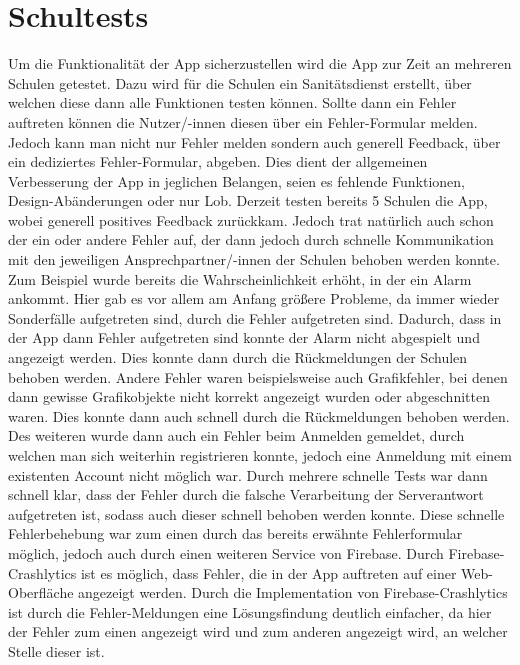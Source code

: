 \section{Schultests}
Um die Funktionalität der App sicherzustellen wird die App zur Zeit an 
mehreren Schulen getestet. Dazu wird für die Schulen ein Sanitätsdienst erstellt,
über welchen diese dann alle Funktionen testen können. Sollte dann ein Fehler
auftreten können die Nutzer/-innen diesen über ein Fehler-Formular melden. 
Jedoch kann man nicht nur Fehler melden sondern auch generell Feedback, über ein
dediziertes Fehler-Formular, abgeben. Dies dient der allgemeinen Verbesserung
der App in jeglichen Belangen, seien es fehlende Funktionen, Design-Abänderungen
oder nur Lob. Derzeit testen bereits 5 Schulen die App, wobei generell positives
Feedback zurückkam. Jedoch trat natürlich auch schon der ein oder andere Fehler 
auf, der dann jedoch durch schnelle Kommunikation mit den jeweiligen 
Ansprechpartner/-innen der Schulen behoben werden konnte.
Zum Beispiel wurde bereits die Wahrscheinlichkeit erhöht, in der ein Alarm 
ankommt. Hier gab es vor allem am Anfang größere Probleme, da immer wieder 
Sonderfälle aufgetreten sind, durch die Fehler aufgetreten sind. Dadurch, dass
in der App dann Fehler aufgetreten sind konnte der Alarm nicht abgespielt und 
angezeigt werden. Dies konnte dann durch die Rückmeldungen der Schulen behoben
werden. Andere Fehler waren beispielsweise auch Grafikfehler, bei denen dann
gewisse Grafikobjekte nicht korrekt angezeigt wurden oder abgeschnitten waren.
Dies konnte dann auch schnell durch die Rückmeldungen behoben werden.
Des weiteren wurde dann auch ein Fehler beim Anmelden gemeldet, durch welchen
man sich weiterhin registrieren konnte, jedoch eine Anmeldung mit einem 
existenten Account nicht möglich war.
Durch mehrere schnelle Tests war dann schnell klar, dass der Fehler durch die 
falsche Verarbeitung der Serverantwort aufgetreten ist, sodass auch dieser 
schnell behoben werden konnte. 
Diese schnelle Fehlerbehebung war zum einen durch das bereits erwähnte 
Fehlerformular möglich, jedoch auch durch einen weiteren Service von Firebase.
Durch Firebase-Crashlytics ist es möglich, dass Fehler, die in der App 
auftreten auf einer Web-Oberfläche angezeigt werden. Durch die Implementation 
von Firebase-Crashlytics ist durch die Fehler-Meldungen eine Lösungsfindung 
deutlich einfacher, da hier der Fehler zum einen angezeigt wird und zum anderen
angezeigt wird, an welcher Stelle dieser ist.